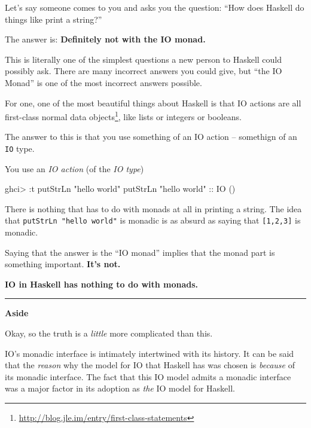 \documentclass[]{article}
\newenvironment{Shaded}{}{}
\newcommand{\DataTypeTok}[1]{\textcolor[rgb]{0.56,0.13,0.00}{{#1}}}
\newcommand{\StringTok}[1]{\textcolor[rgb]{0.25,0.44,0.63}{{#1}}}
\newcommand{\OtherTok}[1]{\textcolor[rgb]{0.00,0.44,0.13}{{#1}}}
\newcommand{\FunctionTok}[1]{\textcolor[rgb]{0.02,0.16,0.49}{{#1}}}
\newcommand{\NormalTok}[1]{{#1}}
\renewcommand{\href}[2]{#2\footnote{\url{#1}}}
\begin{document}
Let's say someone comes to you and asks you the question: ``How does
Haskell do things like print a string?''

The answer is: \textbf{Definitely not with the IO monad.}

This is literally one of the simplest questions a new person to Haskell
could possibly ask. There are many incorrect answers you could give, but
``the IO Monad'' is one of the most incorrect answers possible.

For one, one of the most beautiful things about Haskell is that IO
actions are all
\href{http://blog.jle.im/entry/first-class-statements}{first-class
normal data objects}, like lists or integers or booleans.

The answer to this is that you use something of an IO action --
somethign of an \texttt{IO} type.

You use an \emph{IO action} (of the \emph{IO type})

\begin{Shaded}
\begin{Highlighting}[]
\NormalTok{ghci}\FunctionTok{>} \FunctionTok{:}\NormalTok{t putStrLn }\StringTok{"hello world"}
\NormalTok{putStrLn }\StringTok{"hello world"}\OtherTok{ ::} \DataTypeTok{IO} \NormalTok{()}
\end{Highlighting}
\end{Shaded}

There is nothing that has to do with monads at all in printing a string.
The idea that \texttt{putStrLn\ "hello\ world"} is monadic is as absurd
as saying that \texttt{{[}1,2,3{]}} is monadic.

Saying that the answer is the ``IO monad'' implies that the monad part
is something important. \textbf{It's not.}

\textbf{IO in Haskell has nothing to do with monads.}

\begin{center}\rule{0.5\linewidth}{\linethickness}\end{center}

\textbf{Aside}

Okay, so the truth is a \emph{little} more complicated than this.

IO's monadic interface is intimately intertwined with its history. It
can be said that the \emph{reason} why the model for IO that Haskell has
was chosen is \emph{because} of its monadic interface. The fact that
this IO model admits a monadic interface was a major factor in its
adoption as \emph{the} IO model for Haskell.
\end{document}

